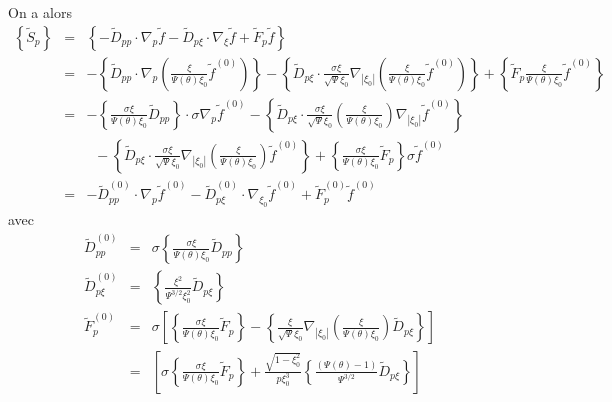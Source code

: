 On a alors \begin{eqnarray*}
\left\{ \widetilde{S}_{p}\right\}  & = & \left\{ -\widetilde{D}_{pp}\cdot\nabla_{p}\widetilde{f}-\widetilde{D}_{p\xi}\cdot\nabla_{\xi}\widetilde{f}+\widetilde{F}_{p}\widetilde{f}\right\} \\
 & = & -\left\{ \widetilde{D}_{pp}\cdot\nabla_{p}\left(\frac{\xi}{\Psi(\theta)\xi_{0}}\widetilde{f}^{(0)}\right)\right\} -\left\{ \widetilde{D}_{p\xi}\cdot\frac{\sigma\xi}{\sqrt{\Psi}\xi_{0}}\nabla_{\left|\xi_{0}\right|}\left(\frac{\xi}{\Psi(\theta)\xi_{0}}\widetilde{f}^{(0)}\right)\right\} +\left\{ \widetilde{F}_{p}\frac{\xi}{\Psi(\theta)\xi_{0}}\widetilde{f}^{(0)}\right\} \\
 & = & -\left\{ \frac{\sigma\xi}{\Psi(\theta)\xi_{0}}\widetilde{D}_{pp}\right\} \cdot\sigma\nabla_{p}\widetilde{f}^{(0)}-\left\{ \widetilde{D}_{p\xi}\cdot\frac{\sigma\xi}{\sqrt{\Psi}\xi_{0}}\left(\frac{\xi}{\Psi(\theta)\xi_{0}}\right)\nabla_{\left|\xi_{0}\right|}\widetilde{f}^{(0)}\right\} \\
 &  & \;\;-\left\{ \widetilde{D}_{p\xi}\cdot\frac{\sigma\xi}{\sqrt{\Psi}\xi_{0}}\nabla_{\left|\xi_{0}\right|}\left(\frac{\xi}{\Psi(\theta)\xi_{0}}\right)\widetilde{f}^{(0)}\right\} +\left\{ \frac{\sigma\xi}{\Psi(\theta)\xi_{0}}\widetilde{F}_{p}\right\} \sigma\widetilde{f}^{(0)}\\
 & = & -\widetilde{D}_{pp}^{(0)}\cdot\nabla_{p}\widetilde{f}^{(0)}-\widetilde{D}_{p\xi}^{(0)}\cdot\nabla_{\xi_{0}}\widetilde{f}^{(0)}+\widetilde{F}_{p}^{(0)}\widetilde{f}^{(0)}\end{eqnarray*}
 avec \begin{eqnarray*}
\widetilde{D}_{pp}^{(0)} & = & \sigma\left\{ \frac{\sigma\xi}{\Psi(\theta)\xi_{0}}\widetilde{D}_{pp}\right\} \\
\widetilde{D}_{p\xi}^{(0)} & = & \left\{ \frac{\xi^{2}}{\Psi^{3/2}\xi_{0}^{2}}\widetilde{D}_{p\xi}\right\} \\
\widetilde{F}_{p}^{(0)} & = & \sigma\left[\left\{ \frac{\sigma\xi}{\Psi(\theta)\xi_{0}}\widetilde{F}_{p}\right\} -\left\{ \frac{\xi}{\sqrt{\Psi}\xi_{0}}\nabla_{\left|\xi_{0}\right|}\left(\frac{\xi}{\Psi(\theta)\xi_{0}}\right)\widetilde{D}_{p\xi}\right\} \right]\\
 & = & \left[\sigma\left\{ \frac{\sigma\xi}{\Psi(\theta)\xi_{0}}\widetilde{F}_{p}\right\} +\frac{\sqrt{1-\xi_{0}^{2}}}{p\xi_{0}^{3}}\left\{ \frac{\left(\Psi(\theta)-1\right)}{\Psi^{3/2}}\widetilde{D}_{p\xi}\right\} \right]\end{eqnarray*}
